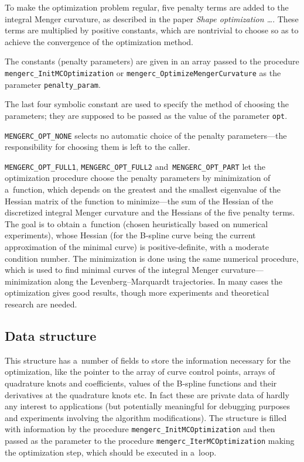 To make the optimization problem regular, five penalty terms are added to
the integral Menger curvature, as described in the paper \emph{Shape
optimization \ldots}. These terms are multiplied by positive constants,
which are nontrivial to choose so as to achieve the convergence of the
optimization method.

The constants (penalty parameters) are given in an
array passed to the procedure \texttt{mengerc\_InitMCOptimization} or
\texttt{mengerc\_OptimizeMengerCurvature} as the parameter
\texttt{penalty\_param}.

The last four symbolic constant are used to specify the method of choosing
the parameters; they are supposed to be passed as the value of the parameter
\texttt{opt}.

\texttt{MENGERC\_OPT\_NONE} selects no automatic choice of the penalty
parameters---the responsibility for choosing them is left to the caller.

\texttt{MENGERC\_OPT\_FULL1}, \texttt{MENGERC\_OPT\_FULL2}
and~\texttt{MENGERC\_OPT\_PART} let the optimization procedure choose the
penalty parameters by minimization of a~function, which depends on the
greatest and the smallest eigenvalue of the Hessian matrix of the function
to minimize---the sum of the Hessian of the discretized integral Menger
curvature and the Hessians of the five penalty terms. The goal is to obtain
a~function (chosen heuristically based on numerical experiments), whose
Hessian (for the B-spline curve being the current approximation of the
minimal curve) is positive-definite, with a moderate condition number.
The minimization is done using the same numerical procedure, which is
used to find minimal curves of the integral Menger curvature---minimization
along the Levenberg--Marquardt trajectories. In many cases the optimization
gives good results, though more experiments and theoretical research are
needed.


\subsection{Data structure}


This structure has a~number of fields to store the information necessary for
the optimization, like the pointer to the array of curve control points,
arrays of quadrature knots and coefficients, values of the B-spline
functions and their derivatives at the quadrature knots etc. In fact these
are private data of hardly any interest to applications (but potentially
meaningful for debugging purposes and experiments involving the algorithm
modifications). The structure is filled with information by the procedure
\texttt{mengerc\_InitMCOptimization} and then passed as the parameter to the
procedure \texttt{mengerc\_IterMCOptimization} making the optimization step,
which should be executed in a~loop.


